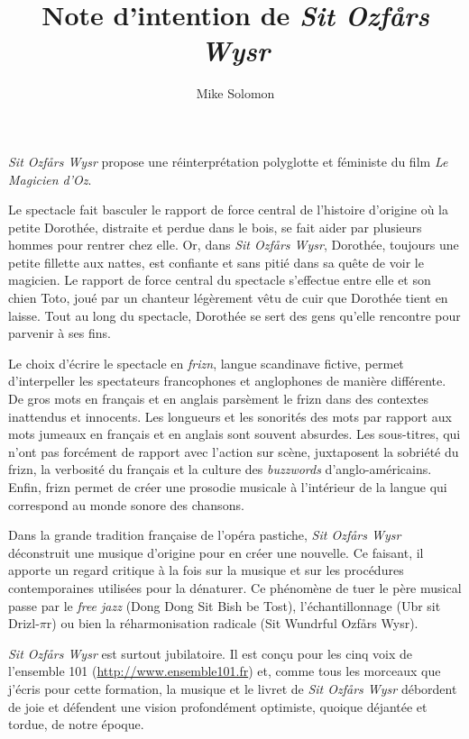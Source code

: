 \documentclass{article}
\title{Note d'intention de \emph{Sit Ozfårs Wysr}}
\author{Mike Solomon}
\date{}
\begin{document}
\thispagestyle{empty}
\maketitle
\thispagestyle{empty}
\emph{Sit Ozfårs Wysr} propose une réinterprétation polyglotte
et féministe du film \emph{Le Magicien d'Oz}.\par

Le spectacle fait basculer le rapport de force central de l'histoire
d'origine où la petite Dorothée,
distraite et perdue dans le bois, se fait aider par plusieurs hommes
pour rentrer chez elle. Or, dans \emph{Sit Ozfårs Wysr},
Dorothée, toujours une petite fillette aux nattes, est confiante et sans pitié dans sa quête de voir le magicien.
Le rapport de force central du
spectacle s'effectue entre elle et son chien Toto,
joué par un chanteur légèrement vêtu de cuir que Dorothée tient en laisse.
Tout au long du spectacle, Dorothée se sert des gens qu'elle rencontre
pour parvenir à ses fins.\par

Le choix d'écrire le spectacle en \emph{frizn}, langue
scandinave fictive, permet d'interpeller les spectateurs francophones
et anglophones de manière différente.
De \og{}gros mots\fg{} en français et en anglais parsèment le frizn dans des
contextes inattendus et innocents. Les longueurs et les sonorités
des mots par
rapport aux mots jumeaux en français et en anglais sont souvent absurdes. Les
sous-titres, qui n'ont pas forcément de rapport avec l'action sur scène,
juxtaposent la sobriété du frizn, la verbosité du français et
la culture des \emph{buzzwords} d'anglo-américains.
Enfin, frizn permet de créer une prosodie musicale à l'intérieur de la langue
qui correspond au monde sonore des chansons.\par

Dans la grande tradition française de l'opéra pastiche, \emph{Sit Ozfårs
Wysr} déconstruit une musique
d'origine pour en créer une nouvelle. Ce faisant, il apporte un regard
critique à la fois sur la musique et sur les procédures contemporaines utilisées
pour la dénaturer. Ce phénomène de \og{}tuer le père\fg{} musical
passe par le \emph{free jazz} (Dong Dong Sit Bish be Tost), l'échantillonnage (Ubr
sit Drizl-$\pi$r) ou bien la réharmonisation radicale (Sit Wundrful Ozfårs
Wysr).\par

\emph{Sit Ozfårs Wysr} est surtout jubilatoire. Il est conçu pour les cinq
voix de l'ensemble 101 (\url{http://www.ensemble101.fr}) et, comme tous les morceaux que
j'écris pour cette formation,
la musique et le livret de \emph{Sit Ozfårs
Wysr} débordent de joie et défendent une vision profondément optimiste, quoique
déjantée et tordue, de notre époque.
\end{document}
